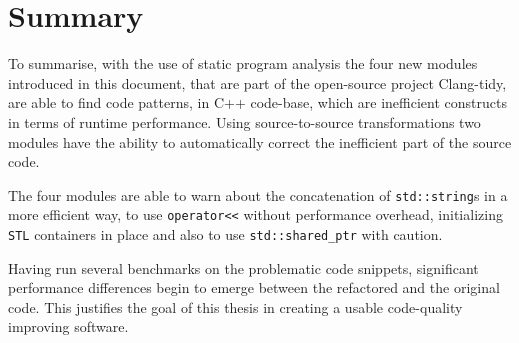 \section{Summary}
\par To summarise, with the use of static program analysis the four new modules introduced in this document, that are part of the open-source project Clang-tidy, are able to find code patterns, in C++ code-base, which are inefficient constructs in terms of runtime performance. Using source-to-source transformations two modules have the ability to automatically correct the inefficient part of the source code. \medskip
\par The four modules are able to warn about the concatenation of \verb|std::string|s in a more efficient way, to use \verb|operator<<| without performance overhead, initializing \verb|STL| containers in place and also to use \verb|std::shared_ptr| with caution. \medskip
\par Having run several benchmarks on the problematic code snippets, significant performance differences begin to emerge between the refactored and the original code. This justifies the goal of this thesis in creating a usable code-quality improving software. 
